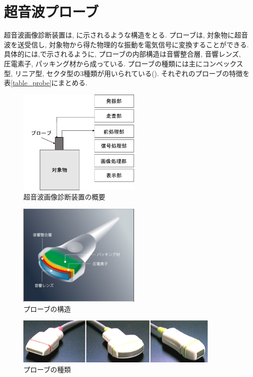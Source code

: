 \section{超音波プローブ}
超音波画像診断装置は, に示されるような構造をとる. プローブは, 対象物に超音波を送受信し, 対象物から得た物理的な振動を電気信号に変換することができる. 具体的には,で示されるように, プローブの内部構造は音響整合層, 音響レンズ, 圧電素子, パッキング材から成っている.  プローブの種類には主にコンベックス型, リニア型, セクタ型の3種類が用いられている(). それぞれのプローブの特徴を表\ref{table_probe}にまとめる. 
\begin{figure}[H]
  \begin{center}
    \includegraphics[width=60mm]{fig/ultradev.pdf}
  \end{center}
  \caption{超音波画像診断装置の概要}
\end{figure}
\begin{figure}[H]
  \begin{center}
    \includegraphics[width=60mm]{fig/img_probe.pdf}
  \end{center}
  \caption{プローブの構造}
\end{figure}
\begin{figure}[H]
  \begin{center}
    \includegraphics[width=100mm]{fig/probe3.pdf}
  \end{center}
  \caption{プローブの種類}
\end{figure}

